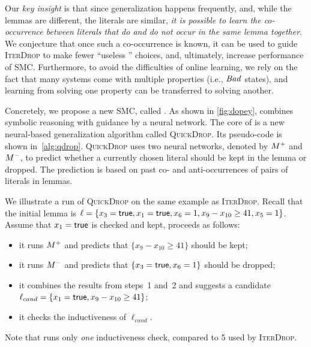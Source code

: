 Our \emph{key insight} is that since generalization happens
frequently, and, while the lemmas are different, the literals are similar, \emph{it is
possible to learn the co-occurrence between literals that do and do not occur in
the same lemma together}. We conjecture that once such a co-occurrence 
is known, it can be used to guide \textsc{IterDrop} to make
fewer ``useless '' choices, and, ultimately, increase performance of SMC.
Furthermore, to avoid the difficulties of online learning, we rely on the fact
that many systems come with multiple properties (i.e., $\mathit{Bad}$ states), and
learning from solving one property can be transferred to solving another.

Concretely, we propose a new SMC, called \dpy. As shown in
\cref{fig:dopey}, \dpy combines symbolic reasoning with guidance by a
neural network. The core of \dpy is a new neural-based generalization
algorithm called \textsc{QuickDrop}. Its pseudo-code is shown
in~\cref{alg:qdrop}. \textsc{QuickDrop} uses two neural networks, denoted by
$M^+$ and $M^-$, to predict whether a currently
chosen literal should be kept in the lemma or dropped. The prediction is based on past co- and anti-occurrences of pairs of  literals in lemmas. 


We illustrate a run of \textsc{QuickDrop} on the same example as
\textsc{IterDrop}. Recall that the initial lemma is $\ell = \{x_3 =
\textsf{true}, x_1 = \textsf{true}, x_6 = 1, x_9 - x_{10} \geq 41, x_5 = 1\}$.
Assume that $x_1 = \textsf{true}$ is checked and kept, \tool proceeds as follows:
\begin{itemize}
\item it runs $M^+$ and predicts that $\{x_9 - x_{10} \geq 41\}$ should be kept;
\item it runs $M^-$ and predicts that $\{x_3 =
\textsf{true}, x_6 = 1\}$ should be dropped;
\item it combines the results from steps~1 and~2 and suggests a candidate $\ell_{cand}=\{x_1 =
  \textsf{true}, x_9 - x_{10} \geq 41\}$;
\item it checks the inductiveness of $\ell_{cand}$.
\end{itemize}
Note that \tool runs only \emph{one} inductiveness
check, compared to 5 used by \textsc{IterDrop}.

